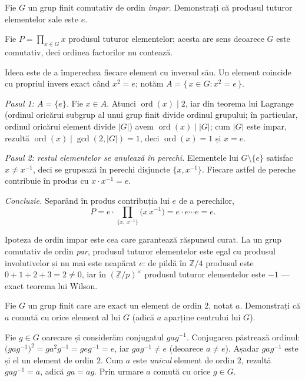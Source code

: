 \begin{problema}[Clasică]
Fie $G$ un grup finit comutativ de ordin \emph{impar}. Demonstrați că
produsul tuturor elementelor sale este $e$.
\end{problema}

\begin{solutie}
Fie $P = \prod_{x \in G} x$ produsul tuturor elementelor; acesta are sens
deoarece $G$ este comutativ, deci ordinea factorilor nu contează.

Ideea este de a împerechea fiecare element cu inversul său. Un
element coincide cu propriul invers exact când $x^{2}=e$; notăm
$A=\{\, x \in G : x^{2}=e \,\}$.

\smallskip
\textit{Pasul 1: $A=\{e\}$.} Fie $x \in A$. Atunci $\operatorname{ord}(x) \mid 2$,
iar din teorema lui Lagrange (ordinul oricărui subgrup al unui grup finit
divide ordinul grupului; în particular, ordinul oricărui element
divide $|G|$) avem $\operatorname{ord}(x) \mid |G|$; cum $|G|$
este impar, rezultă $\operatorname{ord}(x) \mid \gcd(2,|G|)=1$, deci
$\operatorname{ord}(x)=1$ și $x=e$.

\smallskip
\textit{Pasul 2: restul elementelor se anulează în perechi.}
Elementele lui $G \setminus \{e\}$ satisfac $x \neq x^{-1}$, deci se
grupează în perechi disjuncte $\{x, x^{-1}\}$. Fiecare astfel de
pereche contribuie în produs cu $x \cdot x^{-1} = e$.

\smallskip
\textit{Concluzie.} Separând în produs contribuția lui $e$ de a
perechilor,
\[
  P = e \cdot \prod_{\{x,\,x^{-1}\}} \bigl(x\,x^{-1}\bigr)
    = e \cdot e \cdots e = e .
\]
\end{solutie}

\begin{obs}
Ipoteza de ordin impar este cea care garantează răspunsul curat.
La un grup comutativ de ordin \emph{par}, produsul tuturor elementelor este
egal cu produsul involutivelor și nu mai este neapărat $e$: de pildă
în $\mathbb{Z}/4$ produsul este $0+1+2+3=2 \neq 0$, iar în
$(\mathbb{Z}/p)^{\times}$ produsul tuturor elementelor este $-1$ --- exact
teorema lui Wilson.
\end{obs}

\begin{problema}[Clasică]
Fie $G$ un grup finit care are exact un element de ordin $2$, notat $a$.
Demonstrați că $a$ comută cu orice element al lui $G$ (adică
$a$ aparține centrului lui $G$).
\end{problema}

\begin{solutie}
Fie $g \in G$ oarecare și considerăm conjugatul $gag^{-1}$.
Conjugarea păstrează ordinul: $\bigl(gag^{-1}\bigr)^{2}
= ga^{2}g^{-1} = geg^{-1} = e$, iar $gag^{-1} \neq e$ (deoarece
$a \neq e$). Așadar $gag^{-1}$ este și el un element de ordin $2$.
Cum $a$ este \emph{unicul} element de ordin $2$, rezultă
$gag^{-1} = a$, adică $ga = ag$. Prin urmare $a$ comută cu orice
$g \in G$.
\end{solutie}

